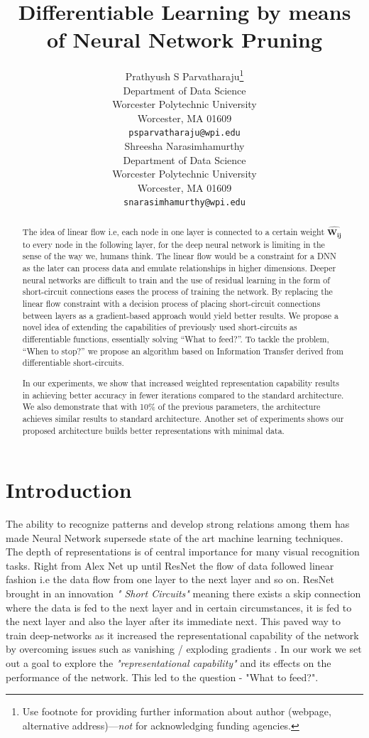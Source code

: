 \documentclass{article}
\title{Differentiable Learning by means of Neural Network Pruning}
\author{
  Prathyush S Parvatharaju\thanks{Use footnote for providing further
    information about author (webpage, alternative
    address)---\emph{not} for acknowledging funding agencies.} \\
  Department of Data Science\\
  Worcester Polytechnic University\\
  Worcester, MA 01609 \\
  \texttt{psparvatharaju@wpi.edu} \\
   \And
 Shreesha Narasimhamurthy \\
  Department of Data Science\\
  Worcester Polytechnic University\\
  Worcester, MA 01609 \\
  \texttt{snarasimhamurthy@wpi.edu} \\
}
\let\oldhat\hat
\renewcommand{\hat}[1]{\oldhat{\mathbf{#1}}}
\begin{document}
\maketitle

\begin{abstract}
The idea of linear flow i.e, each node in one layer is connected to a certain weight $\hat{W_{ij}}$ to every node in the following layer, for the deep neural network is limiting in the sense of the way we, humans think. The linear flow would be a constraint for a DNN as the later can process data and emulate relationships in higher dimensions. Deeper neural networks are difficult to train and the use of residual learning in the form of short-circuit connections eases the process of training the network. By replacing the linear flow constraint with a decision process of placing short-circuit connections between layers as a gradient-based approach would yield better results. We propose a novel idea of extending the capabilities of previously used short-circuits as differentiable functions, essentially solving “What to feed?”. To tackle the problem, “When to stop?” we propose an algorithm based on Information Transfer derived from differentiable short-circuits. 

In our experiments, we show that increased weighted representation capability results in achieving better accuracy in fewer iterations compared to the standard architecture. We also demonstrate that with 10\% of the previous parameters, the architecture achieves similar results to standard architecture. Another set of experiments shows our proposed architecture builds better representations with minimal data.
\end{abstract}




\section{Introduction}
The ability to recognize patterns and develop strong relations among them has made Neural Network supersede state of the art machine learning techniques. The depth of representations is of central importance for many visual recognition tasks. Right from Alex Net \cite{Krizhevsky2012ImageNetCW} up until ResNet \cite{He2016DeepRL} the flow of data followed linear fashion i.e the data flow from one layer to the next layer and so on. ResNet brought in an innovation \emph{" Short Circuits"} meaning there exists a skip connection where the data is fed to the next layer and in certain circumstances, it is fed to the next layer and also the layer after its immediate next. This paved way to train deep-networks as it increased the representational capability of the network by overcoming issues such as vanishing / exploding gradients \cite{Bengio1994LearningLD, Glorot2010UnderstandingTD}. In our work we set out a goal to explore the \emph{"representational capability"} and its effects on the performance of the network. This led to the question - "What to feed?".
\end{document}
